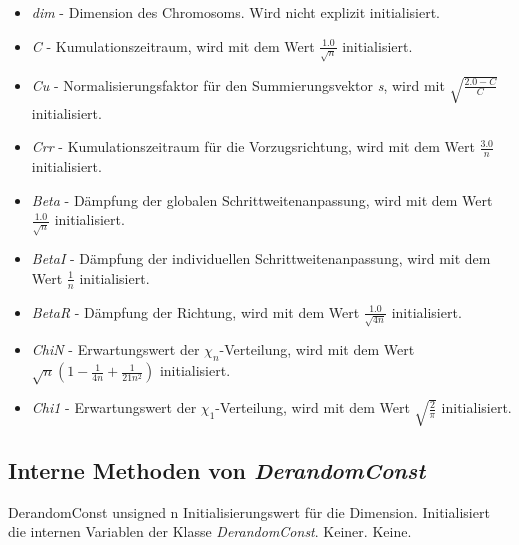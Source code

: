 \documentclass{report}
\begin{document}
\begin{itemize}
\item {\em dim} -
 Dimension des Chromosoms. Wird nicht explizit initialisiert.

\item {\em C} -
 Kumulationszeitraum, wird mit dem Wert $\frac{1.0}{\sqrt{n}}$ initialisiert.

\item {\em Cu} -
 Normalisierungsfaktor f\"ur den Summierungsvektor {\em s}, 
 wird mit $\sqrt{\frac{2.0 - C}{C}}$ initialisiert.

\item {\em Crr} -
 Kumulationszeitraum f\"ur die Vorzugsrichtung, wird mit dem 
 Wert $\frac{3.0}{n}$ initialisiert. 

\item {\em Beta} -
 D\"ampfung der globalen Schrittweitenanpassung, wird mit dem Wert 
 $\frac{1.0}{\sqrt{n}}$ initialisiert.

\item {\em BetaI} -
 D\"ampfung der individuellen Schrittweitenanpassung, wird mit dem Wert 
 $\frac{1}{n}$ initialisiert.

\item {\em BetaR} -
 D\"ampfung der Richtung, wird mit dem Wert 
 $\frac{1.0}{\sqrt{4n}}$ initialisiert. 

\item {\em ChiN} -
 Erwartungswert der $\chi_n$-Verteilung, wird mit dem Wert\\ 
 $\sqrt{n}(1 - \frac{1}{4n} + \frac{1}{21n^2})$ initialisiert.

\item {\em Chi1} -
 Erwartungswert der $\chi_1$-Verteilung, wird mit dem Wert 
 $\sqrt{\frac{2}{\pi}}$ initialisiert.

\end{itemize}

\newpage

\subsection{Interne Methoden von {\em DerandomConst}}

\setNormalInstance
\printMethodWithOneParam
{}
{DerandomConst}
{unsigned}
{n}
{Initialisierungswert f\"ur die Dimension.}
{Initialisiert die internen Variablen der Klasse {\em DerandomConst}.}
{Keiner.}
{Keine.}
\end{document}
